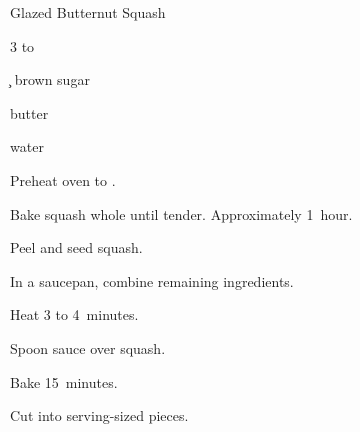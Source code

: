 \begin{recipe}{Glazed Butternut Squash}{}{}

\begin{ingredients}
\item 3 to  
\item \c{\half} brown sugar
\item \C{\quarter} butter
\item {} water
\end{ingredients}

\begin{directions}
\item Preheat oven to .
\item Bake squash whole until tender. Approximately 1~hour.
\item Peel and seed squash.
\item In a saucepan, combine remaining ingredients.
\item Heat 3 to 4~minutes.
\item Spoon sauce over squash.
\item Bake 15~minutes.
\item Cut into serving-sized pieces.
\end{directions}

\end{recipe}
